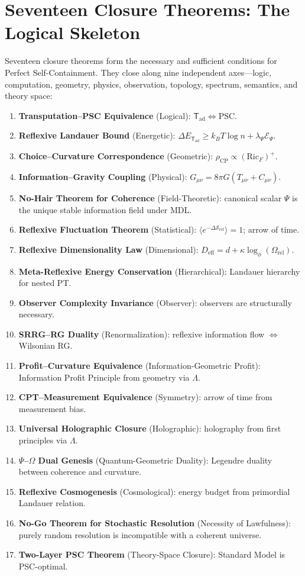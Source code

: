 \documentclass[11pt]{article}
\newcommand{\Trans}{\ensuremath{{\mathsf{T}_{\mathrm{ad}}}}}
\newcommand{\PSC}{\text{PSC}}
\begin{document}
\section{Seventeen Closure Theorems: The Logical Skeleton}

Seventeen closure theorems form the necessary and sufficient conditions for Perfect Self-Containment. They close along nine independent axes---logic, computation, geometry, physics, observation, topology, spectrum, semantics, and theory space:

\begin{enumerate}[nosep,label=\arabic*.]
\item \textbf{Transputation--PSC Equivalence} (Logical): $\Trans\Leftrightarrow\PSC$.
\item \textbf{Reflexive Landauer Bound} (Energetic): $\Delta E_\Trans \ge k_BT\log n + \lambda_\Psi\mathcal{E}_\Psi$.
\item \textbf{Choice--Curvature Correspondence} (Geometric): $\rho_\mathrm{CP}\propto(\mathrm{Ric}_F)^+$.
\item \textbf{Information--Gravity Coupling} (Physical): $G_{\mu\nu}=8\pi G(T_{\mu\nu}+C_{\mu\nu})$.
\item \textbf{No-Hair Theorem for Coherence} (Field-Theoretic): canonical scalar $\Psi$ is the unique stable information field under MDL.
\item \textbf{Reflexive Fluctuation Theorem} (Statistical): $\langle e^{-\Delta\mathcal{S}_\mathrm{ref}}\rangle=1$; arrow of time.
\item \textbf{Reflexive Dimensionality Law} (Dimensional): $D_\mathrm{eff}=d+\kappa\log_\phi(\Omega_\mathrm{rel})$.
\item \textbf{Meta-Reflexive Energy Conservation} (Hierarchical): Landauer hierarchy for nested PT.
\item \textbf{Observer Complexity Invariance} (Observer): observers are structurally necessary.
\item \textbf{SRRG--RG Duality} (Renormalization): reflexive information flow $\Leftrightarrow$ Wilsonian RG.
\item \textbf{Profit--Curvature Equivalence} (Information-Geometric Profit): Information Profit Principle from geometry via $\Lambda$.
\item \textbf{CPT--Measurement Equivalence} (Symmetry): arrow of time from measurement bias.
\item \textbf{Universal Holographic Closure} (Holographic): holography from first principles via $\Lambda$.
\item \textbf{$\Psi$--$\Omega$ Dual Genesis} (Quantum-Geometric Duality): Legendre duality between coherence and curvature.
\item \textbf{Reflexive Cosmogenesis} (Cosmological): energy budget from primordial Landauer relation.
\item \textbf{No-Go Theorem for Stochastic Resolution} (Necessity of Lawfulness): purely random resolution is incompatible with a coherent universe.
\item \textbf{Two-Layer PSC Theorem} (Theory-Space Closure): Standard Model is PSC-optimal.
\end{enumerate}
\end{document}
